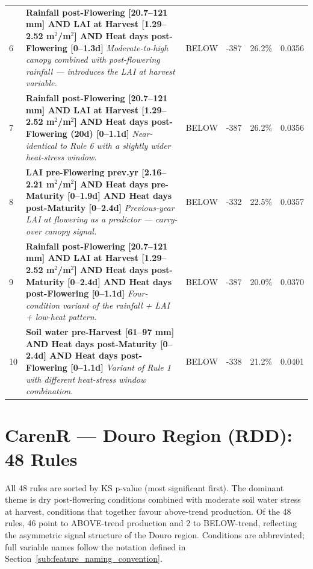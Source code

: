 {\begin{longtable}{p{0.4cm}|p{8.5cm}|>{\centering\arraybackslash}p{0.9cm}|p{1.3cm}|p{1.2cm}|p{1.2cm}}
  6 & \textbf{Rainfall post-Flowering [20.7--121 mm] AND LAI at Harvest [1.29--2.52 m$^2$/m$^2$] AND Heat days post-Flowering [0--1.3d]} \newline \textit{Moderate-to-high canopy combined with post-flowering rainfall — introduces the LAI at harvest variable.} & {\footnotesize BELOW} & -387 & 26.2\% & 0.0356 \\
  7 & \textbf{Rainfall post-Flowering [20.7--121 mm] AND LAI at Harvest [1.29--2.52 m$^2$/m$^2$] AND Heat days post-Flowering (20d) [0--1.1d]} \newline \textit{Near-identical to Rule 6 with a slightly wider heat-stress window.} & {\footnotesize BELOW} & -387 & 26.2\% & 0.0356 \\
  8 & \textbf{LAI pre-Flowering prev.yr [2.16--2.21 m$^2$/m$^2$] AND Heat days pre-Maturity [0--1.9d] AND Heat days post-Maturity [0--2.4d]} \newline \textit{Previous-year LAI at flowering as a predictor — carry-over canopy signal.} & {\footnotesize BELOW} & -332 & 22.5\% & 0.0357 \\
  9 & \textbf{Rainfall post-Flowering [20.7--121 mm] AND LAI at Harvest [1.29--2.52 m$^2$/m$^2$] AND Heat days post-Maturity [0--2.4d] AND Heat days post-Flowering [0--1.1d]} \newline \textit{Four-condition variant of the rainfall + LAI + low-heat pattern.} & {\footnotesize BELOW} & -387 & 20.0\% & 0.0370 \\
  10 & \textbf{Soil water pre-Harvest [61--97 mm] AND Heat days post-Maturity [0--2.4d] AND Heat days post-Flowering [0--1.1d]} \newline \textit{Variant of Rule 1 with different heat-stress window combination.} & {\footnotesize BELOW} & -338 & 21.2\% & 0.0401 \\
\end{longtable}
}

\section{CarenR --- Douro Region (RDD): 48 Rules}\label{app_sec:carenr_douro_region_rdd}

All 48 rules are sorted by KS p-value (most significant first). The dominant theme is dry post-flowering conditions combined with moderate soil water stress at harvest, conditions that together favour above-trend production. Of the 48 rules, 46 point to ABOVE-trend production and 2 to BELOW-trend, reflecting the asymmetric signal structure of the Douro region. Conditions are abbreviated; full variable names follow the notation defined in Section~\ref{sub:feature_naming_convention}.

